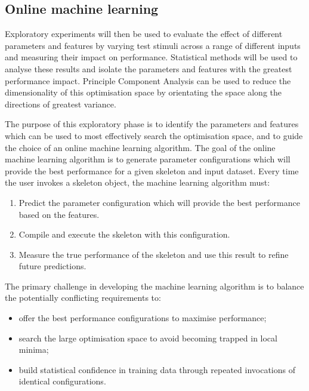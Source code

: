 \subsection{Online machine learning}
Exploratory experiments will then be used to evaluate the effect of
different parameters and features by varying test stimuli across a
range of different inputs and measuring their impact on
performance. Statistical methods will be used to analyse these results
and isolate the parameters and features with the greatest performance
impact. Principle Component Analysis can be used to reduce the
dimensionality of this optimisation space by orientating the space
along the directions of greatest variance.

The purpose of this exploratory phase is to identify the parameters
and features which can be used to most effectively search the
optimisation space, and to guide the choice of an online machine
learning algorithm. The goal of the online machine learning algorithm
is to generate parameter configurations which will provide the best
performance for a given skeleton and input dataset. Every time the
user invokes a skeleton object, the machine learning algorithm must:

\begin{enumerate}
\item Predict the parameter configuration which will provide the best
  performance based on the features.
\item Compile and execute the skeleton with this configuration.
\item Measure the true performance of the skeleton and use this result
  to refine future predictions.
\end{enumerate}

The primary challenge in developing the machine learning algorithm is
to balance the potentially conflicting requirements to:

\begin{itemize}
\item offer the best performance configurations to maximise
  performance;
\item search the large optimisation space to avoid becoming trapped in
  local minima;
\item build statistical confidence in training data through repeated
  invocations of identical configurations.
\end{itemize}

